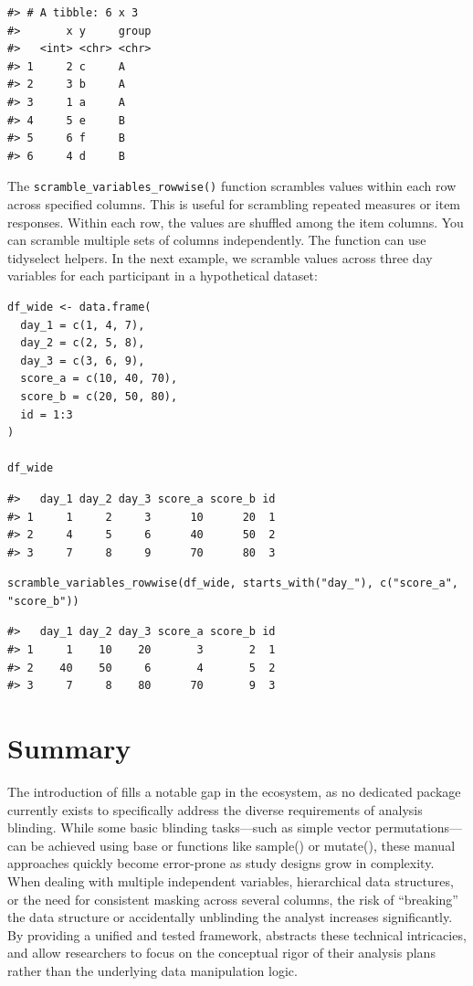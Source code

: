 \begin{verbatim}
#> # A tibble: 6 x 3
#>       x y     group
#>   <int> <chr> <chr>
#> 1     2 c     A    
#> 2     3 b     A    
#> 3     1 a     A    
#> 4     5 e     B    
#> 5     6 f     B    
#> 6     4 d     B
\end{verbatim}

The \texttt{scramble\_variables\_rowwise()} function scrambles values within each row across specified columns. This is useful for scrambling repeated measures or item responses. Within each row, the values are shuffled among the item columns. You can scramble multiple sets of columns independently. The function can use tidyselect helpers. In the next example, we scramble values across three day variables for each participant in a hypothetical dataset:

\begin{verbatim}
df_wide <- data.frame(
  day_1 = c(1, 4, 7),
  day_2 = c(2, 5, 8),
  day_3 = c(3, 6, 9),
  score_a = c(10, 40, 70),
  score_b = c(20, 50, 80),
  id = 1:3
)

df_wide
\end{verbatim}

\begin{verbatim}
#>   day_1 day_2 day_3 score_a score_b id
#> 1     1     2     3      10      20  1
#> 2     4     5     6      40      50  2
#> 3     7     8     9      70      80  3
\end{verbatim}

\begin{verbatim}
scramble_variables_rowwise(df_wide, starts_with("day_"), c("score_a", "score_b"))
\end{verbatim}

\begin{verbatim}
#>   day_1 day_2 day_3 score_a score_b id
#> 1     1    10    20       3       2  1
#> 2    40    50     6       4       5  2
#> 3     7     8    80      70       9  3
\end{verbatim}

\section{Summary}\label{summary}

The introduction of  fills a notable gap in the  ecosystem, as no dedicated package currently exists to specifically address the diverse requirements of analysis blinding. While some basic blinding tasks---such as simple vector permutations---can be achieved using base  or  functions like sample() or mutate(), these manual approaches quickly become error-prone as study designs grow in complexity. When dealing with multiple independent variables, hierarchical data structures, or the need for consistent masking across several columns, the risk of ``breaking'' the data structure or accidentally unblinding the analyst increases significantly. By providing a unified and tested framework,  abstracts these technical intricacies, and allow researchers to focus on the conceptual rigor of their analysis plans rather than the underlying data manipulation logic.

